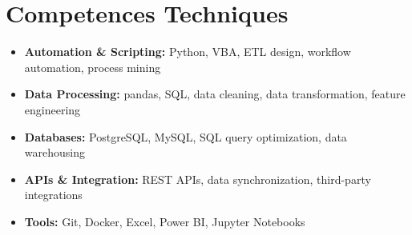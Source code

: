 \documentclass[a4paper,11pt]{article}
\begin{document}
\section{Competences Techniques}
\begin{itemize}[leftmargin=*, nosep]
    \item \small{\textbf{Automation \& Scripting:} Python, VBA, ETL design, workflow automation, process mining}
    \item \small{\textbf{Data Processing:} pandas, SQL, data cleaning, data transformation, feature engineering}
    \item \small{\textbf{Databases:} PostgreSQL, MySQL, SQL query optimization, data warehousing}
    \item \small{\textbf{APIs \& Integration:} REST APIs, data synchronization, third-party integrations}
    \item \small{\textbf{Tools:} Git, Docker, Excel, Power BI, Jupyter Notebooks}
\end{itemize}
\end{document}
